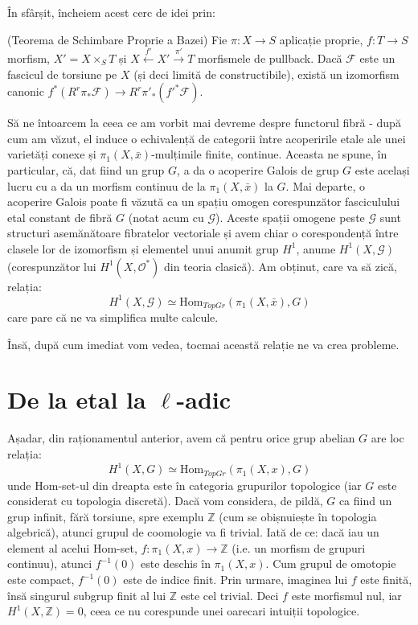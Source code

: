 \documentclass[13pt,openany]{book}
\begin{document}
În sfârșit, încheiem acest cerc de idei prin:

\begin{teo}
(Teorema de Schimbare Proprie a Bazei) Fie $\pi: X \rightarrow S$ aplicație proprie, $f: T \rightarrow S$ morfism, $X' = X \times_S T$ și $X\xleftarrow{f'}X'\xrightarrow{\pi'}T$ morfismele de pullback. Dacă $\mathcal{F}$ este un fascicul de torsiune pe $X$ (și deci limită de constructibile), există un izomorfism canonic $f^*(R^r\pi_*\mathcal{F}) \rightarrow R^r\pi'_*(f'^*\mathcal{F})$.
\end{teo}

Să ne întoarcem la ceea ce am vorbit mai devreme despre functorul fibră - după cum am văzut, el induce o echivalență de categorii între acoperirile etale ale unei varietăți conexe și $\pi_1(X,\bar{x})$-mulțimile finite, continue. Aceasta ne spune, în particular, că, dat fiind un grup $G$, a da o acoperire Galois de grup $G$ este același lucru cu a da un morfism continuu de la $\pi_1(X,\bar{x})$ la $G$. Mai departe, o acoperire Galois poate fi văzută ca un spațiu omogen corespunzător fasciculului etal constant de fibră $G$ (notat acum cu $\mathcal{G}$). Aceste spații omogene peste $\mathcal{G}$ sunt structuri asemănătoare fibratelor vectoriale și avem chiar o corespondență între clasele lor de izomorfism și elementel unui anumit grup $H^1$, anume $H^1(X,\mathcal{G})$ (corespunzător lui $H^1(X,\mathcal{O}^*)$ din teoria clasică). Am obținut, care va să zică, relația:
$$H^1(X,\mathcal{G}) \simeq \text{Hom}_{TopGr}(\pi_1(X,\bar{x}),G)$$
care pare că ne va simplifica multe calcule.

Însă, după cum imediat vom vedea, tocmai această relație ne va crea probleme.

\chapter{De la etal la \texorpdfstring{$\ell$}{l}-adic}

Așadar, din raționamentul anterior, avem că pentru orice grup abelian $G$ are loc relația:
$$H^1(X,G)\simeq \text{Hom}_{TopGr}(\pi_1(X,x),G)$$
unde Hom-set-ul din dreapta este în categoria grupurilor topologice (iar $G$ este considerat cu topologia discretă). Dacă vom considera, de pildă, $G$ ca fiind un grup infinit, fără torsiune, spre exemplu $\mathbb{Z}$ (cum se obișnuiește în topologia algebrică), atunci grupul de coomologie va fi trivial. Iată de ce: dacă iau un element al acelui Hom-set, $f: \pi_1(X,x) \rightarrow \mathbb{Z}$ (i.e. un morfism de grupuri continuu), atunci $f^{-1}(0)$ este deschis în $\pi_1(X,x)$. Cum grupul de omotopie este compact, $f^{-1}(0)$ este de indice finit. Prin urmare, imaginea lui $f$ este finită, însă singurul subgrup finit al lui $\mathbb{Z}$ este cel trivial. Deci $f$ este morfismul nul, iar $H^1(X,\mathbb{Z})=0$, ceea ce nu corespunde unei oarecari intuiții topologice.
\end{document}
